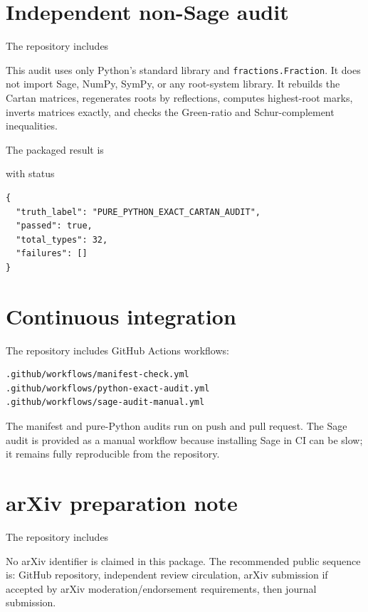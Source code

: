 \documentclass[11pt]{book}
\theoremstyle{definition}
\begin{document}
\section*{Independent non-Sage audit}
The repository includes
\begin{center}\end{center}
This audit uses only Python's standard library and \texttt{fractions.Fraction}. It does not import Sage, NumPy, SymPy, or any root-system library. It rebuilds the Cartan matrices, regenerates roots by reflections, computes highest-root marks, inverts matrices exactly, and checks the Green-ratio and Schur-complement inequalities.

The packaged result is
\begin{center}\end{center}
with status
\begin{lstlisting}[style=sage]
{
  "truth_label": "PURE_PYTHON_EXACT_CARTAN_AUDIT",
  "passed": true,
  "total_types": 32,
  "failures": []
}
\end{lstlisting}

\section*{Continuous integration}
The repository includes GitHub Actions workflows:
\begin{lstlisting}[style=sage]
.github/workflows/manifest-check.yml
.github/workflows/python-exact-audit.yml
.github/workflows/sage-audit-manual.yml
\end{lstlisting}
The manifest and pure-Python audits run on push and pull request. The Sage audit is provided as a manual workflow because installing Sage in CI can be slow; it remains fully reproducible from the repository.

\section*{arXiv preparation note}
The repository includes
\begin{center}\end{center}
No arXiv identifier is claimed in this package. The recommended public sequence is: GitHub repository, independent review circulation, arXiv submission if accepted by arXiv moderation/endorsement requirements, then journal submission.
\end{document}
